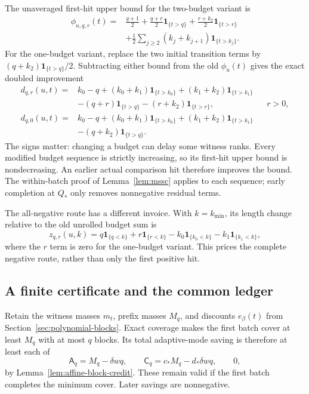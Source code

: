 The unaveraged first-hit upper bound for the two-budget variant is
\[
 \begin{aligned}
 \phi_{u,q,r}(t)={}&\frac{q+1}{2}
  +\frac{q+r}{2}\mathbf1_{\{t>q\}}
  +\frac{r+k_2}{2}\mathbf1_{\{t>r\}}\\
 &+\frac12\sum_{j\ge2}(k_j+k_{j+1})\mathbf1_{\{t>k_j\}}.
 \end{aligned}
\]
For the one-budget variant, replace the two initial transition terms
by $(q+k_2)\mathbf1_{\{t>q\}}/2$.
Subtracting either bound from the old $\phi_u(t)$ gives the exact
doubled improvement
\begin{equation}\label{eq:two-phase-correction}
 \begin{aligned}
 d_{q,r}(u,t)={}&k_0-q+(k_0+k_1)\mathbf1_{\{t>k_0\}}
               +(k_1+k_2)\mathbf1_{\{t>k_1\}}\\
 &-(q+r)\mathbf1_{\{t>q\}}-(r+k_2)\mathbf1_{\{t>r\}},
       &&r>0,\\
 d_{q,0}(u,t)={}&k_0-q+(k_0+k_1)\mathbf1_{\{t>k_0\}}
               +(k_1+k_2)\mathbf1_{\{t>k_1\}}\\
 &-(q+k_2)\mathbf1_{\{t>q\}}.
 \end{aligned}
\end{equation}
The signs matter: changing a budget can delay some witness ranks.
Every modified budget sequence is strictly increasing, so its
first-hit upper bound is nondecreasing. An earlier actual comparison
hit therefore improves the bound. The within-batch proof of
Lemma~\ref{lem:mssc} applies to each sequence; early completion at
$Q_*$ only removes nonnegative residual terms.

The all-negative route has a different invoice. With $k=k_{\min}$,
its length change relative to the old unrolled budget sum is
\begin{equation}\label{eq:two-phase-zero-correction}
 z_{q,r}(u,k)=q\mathbf1_{\{q<k\}}+r\mathbf1_{\{r<k\}}
             -k_0\mathbf1_{\{k_0<k\}}
             -k_1\mathbf1_{\{k_1<k\}},
\end{equation}
where the $r$ term is zero for the one-budget variant.
This prices the complete negative route, rather than only the first
positive hit.

\subsection{A finite certificate and the common ledger}

Retain the witness masses $m_t$, prefix masses $M_q$, and discounts
$e_\beta(t)$ from Section~\ref{sec:polynomial-blocks}. Exact coverage
makes the first batch cover at least $M_q$ with at most $q$ blocks.
Its total adaptive-mode saving is therefore at least each of
\[
 \mathsf A_q=M_q-\delta wq,\qquad
 \mathsf C_q=c_*M_q-d_*\delta wq,\qquad 0,
\]
by Lemma~\ref{lem:affine-block-credit}. These remain valid if the first
batch completes the minimum cover. Later savings are nonnegative.

